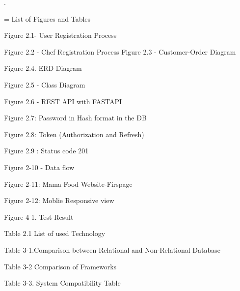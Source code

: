 .\
\
\
\
\
\
\
\
\
\
\
\
\
\
\
\
\
\
\
\
\

= List of Figures and Tables
\

Figure 2.1- User Registration Process

Figure 2.2 - Chef Registration Process
Figure 2.3 - Customer-Order Diagram

Figure 2.4. ERD Diagram

Figure 2.5 - Class Diagram

Figure 2.6 - REST API with FASTAPI

Figure 2.7: Password in Hash format in the DB

Figure 2.8: Token (Authorization and Refresh)

Figure 2.9 : Status code 201

Figure 2-10 - Data flow

Figure 2-11: Mama Food Website-Firspage

Figure 2-12: Moblie Responsive view

Figure 4-1. Test Result


Table 2.1 List of used Technology

Table 3-1.Comparison between Relational and Non-Relational Database

Table 3-2 Comparison of Frameworks

Table 3-3. System Compatibility Table


